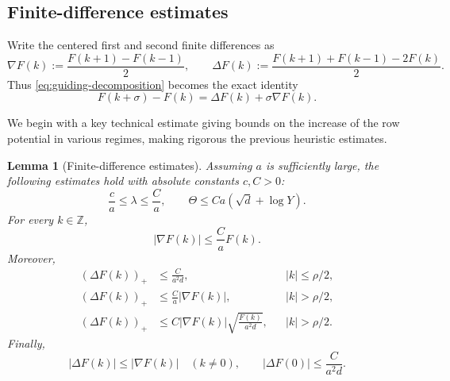\documentclass[reqno,english]{amsart}
\newcommand*{\ZZ}{\mathbb Z}
\newtheorem{lemma}[lemma]{Lemma}
\theoremstyle{definition}
\begin{document}
\subsection{Finite-difference estimates}
Write the centered first and second finite differences as
\begin{equation}\label{eq:finite-differences}
 \nabla F(k):=\frac{F(k+1)-F(k-1)}2,
 \qquad
 \Delta F(k):=\frac{F(k+1)+F(k-1)-2F(k)}2.
\end{equation}
Thus \eqref{eq:guiding-decomposition} becomes the exact identity
\begin{equation}\label{eq:finite-difference-identity}
    F(k+\sigma)-F(k)=\Delta F(k)+\sigma\nabla F(k).
\end{equation}

We begin with a key technical estimate giving bounds on the increase of the row potential in various regimes, making rigorous the previous heuristic estimates.

\begin{lemma}[Finite-difference estimates]\label{lem:potential}
Assuming $a$ is sufficiently large, the following estimates hold with
absolute constants $c,C>0$:
\begin{equation}\label{eq:lambda-theta-bounds}
    \frac{c}{a}\le\lambda\le\frac{C}{a},
    \qquad
    \Theta\le Ca(\sqrt d+\log Y).
\end{equation}
For every $k\in\ZZ$,
\begin{equation}\label{eq:first-difference-bound}
    |\nabla F(k)|\le\frac{C}{a}F(k).
\end{equation}
Moreover,
\begin{align}
 (\Delta F(k))_+&\le\frac{C}{a^2d},
       && |k|\le\rho/2,\label{eq:second-difference-small}\\
 (\Delta F(k))_+&\le\frac{C}{a}|\nabla F(k)|,
       && |k|>\rho/2,\label{eq:second-difference-large-1}\\
 (\Delta F(k))_+&\le
       C|\nabla F(k)|\sqrt{\frac{F(k)}{a^2d}},
       && |k|>\rho/2.\label{eq:second-difference-large-2}
\end{align}
Finally,
\begin{equation}\label{eq:second-by-first}
 |\Delta F(k)|\le|\nabla F(k)|\quad(k\ne0),
 \qquad
 |\Delta F(0)|\le\frac{C}{a^2d}.
\end{equation}
\end{lemma}
\end{document}
